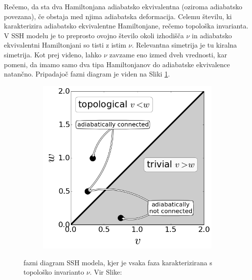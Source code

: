 \begin{multicols}{2}
Rečemo, da sta dva Hamiltonjana adiabatsko ekvivalentna (oziroma adiabatsko povezana), če obstaja med njima adiabatska deformacija.
Celemu številu, ki karakterizira adiabatsko ekvivalentne Hamiltonjane, rečemo topološka invarianta. V SSH modelu je to preprosto ovojno število okoli izhodišča $\nu$ in adiabatsko ekvivalentni Hamiltonjani so tisti z istim $\nu$. Relevantna simetrija je tu kiralna simetrija. Kot prej videno, lahko $\nu$ zavzame eno izmed dveh vrednosti, kar pomeni, da imamo samo dva tipa Hamiltonjanov do adiabatske ekvivalence natančno. Pripadajoč fazni diagram je viden na Sliki \ref{fig:phasediag}.

\begin{figure}[H]
\centering
\begin{subfigure}{.5\textwidth}
\includegraphics[width=\linewidth]{Figures/PhaseDiag.png}
\end{subfigure}
\caption{fazni diagram SSH modela, kjer je vsaka faza karakterizirana s topološko invarianto $\nu$. Vir Slike: \cite{madzar}}
\label{fig:phasediag}
\end{figure}
\end{multicols}

